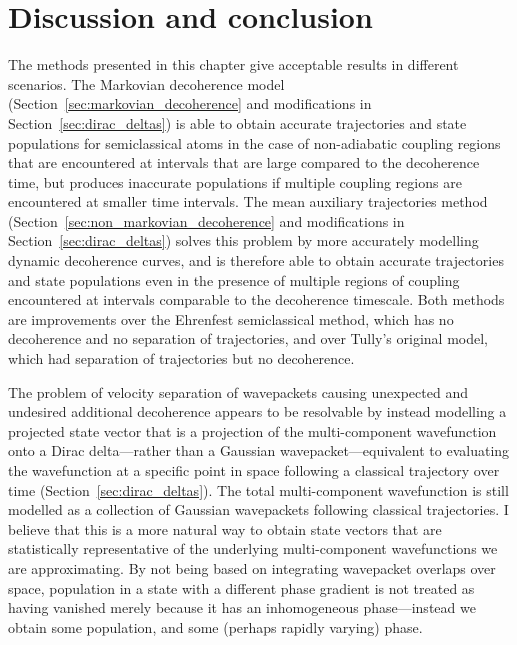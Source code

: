 \clearpage

\section{Discussion and conclusion}\label{sec:HVSC_discussion}

The methods presented in this chapter give acceptable results in different scenarios. The Markovian decoherence model (Section~\ref{sec:markovian_decoherence} and modifications in Section~\ref{sec:dirac_deltas}) is able to obtain accurate trajectories and state populations for semiclassical atoms in the case of non-adiabatic coupling regions that are encountered at intervals that are large compared to the decoherence time, but produces inaccurate populations if multiple coupling regions are encountered at smaller time intervals. The mean auxiliary trajectories method (Section~\ref{sec:non_markovian_decoherence} and modifications in Section~\ref{sec:dirac_deltas}) solves this problem by more accurately modelling dynamic decoherence curves, and is therefore able to obtain accurate trajectories and state populations even in the presence of multiple regions of coupling encountered at intervals comparable to the decoherence timescale. Both methods are improvements over the Ehrenfest semiclassical method, which has no decoherence and no separation of trajectories, and over Tully's original model, which had separation of trajectories but no decoherence. 

The problem of velocity separation of wavepackets causing unexpected and undesired additional decoherence appears to be resolvable by instead modelling a projected state vector that is a projection of the multi-component wavefunction onto a Dirac delta---rather than a Gaussian wavepacket---equivalent to evaluating the wavefunction at a specific point in space following a classical trajectory over time (Section~\ref{sec:dirac_deltas}). The total multi-component wavefunction is still modelled as a collection of Gaussian wavepackets following classical trajectories. I believe that this is a more natural way to obtain state vectors that are statistically representative of the underlying multi-component wavefunctions we are approximating. By not being based on integrating wavepacket overlaps over space, population in a state with a different phase gradient is not treated as having vanished merely because it has an inhomogeneous phase---instead we obtain some population, and some (perhaps rapidly varying) phase.

